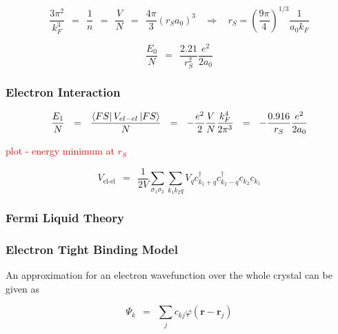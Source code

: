 \documentclass[10pt]{report}
\numberwithin{equation}{chapter}
\begin{document}
\begin{equation*}
\frac{3 \pi^2}{k_F^3} ~~ = ~~ \frac{1}{n} ~~ = ~~ \frac{V}{N} ~~ = ~~ \frac{4\pi}{3} \left(r_S a_0 \right)^3 ~~~~ \Rightarrow ~~~~ r_S = \left( \frac{9\pi}{4} \right)^{1/3} \frac{1}{a_0 k_F}
\end{equation*}

\begin{equation*}
\frac{E_0}{N} ~~ = ~~ \frac{2.21}{r_S^2} \frac{e^2}{2a_0}
\end{equation*}



\subsubsection*{Electron Interaction}

\begin{equation*}
  \frac{E_1}{N} ~~ = ~~ \frac{\bra{FS} V_{el-el} \ket{FS}}{N} ~~ = ~~ 
  - \frac{e^2}{2} \frac{V}{N} \frac{k_F^4}{2 \pi^3} ~~=~~ - \frac{0.916}{r_S} \frac{e^2}{2 a_0}
\end{equation*}


\textcolor{red}{plot - energy minimum at $r_S$}


\begin{equation}
  V_\text{el-el} ~~=~~ \frac{1}{2V} \sum_{\sigma_1 \sigma_2} \sum_{k_1 k_2 q} 
    V_q c_{k_1+q}^\dag c_{k_2-q}^\dag c_{k_2} c_{k_1}
\end{equation}



\subsubsection{Fermi Liquid Theory}

\subsubsection{Electron Tight Binding Model}
%



An approximation for an electron wavefunction over the whole crystal can be given as

\begin{equation}
  \Psi_k ~~=~~ \sum_j c_{kj} \varphi(\mathbf{r}-\mathbf{r}_j)
\end{equation}
\end{document}

